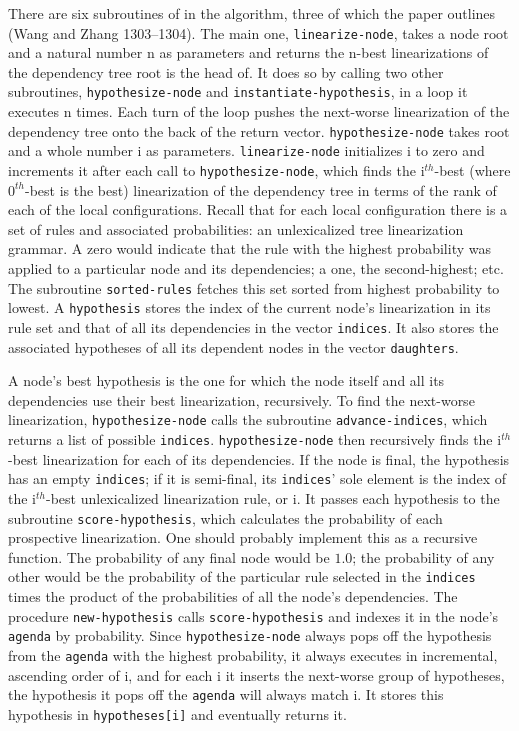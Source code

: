 \documentclass[12pt,letterpaper]{article}
\begin{document}
\begin{flushleft}
  There are six subroutines of in the algorithm, three of which the paper outlines (Wang and Zhang 1303--1304). The main one, \texttt{linearize-node}, takes a node $\textrm{root}$ and a natural number $\textrm{n}$ as parameters and returns the $\textrm{n}$-best linearizations of the dependency tree $\textrm{root}$ is the head of. It does so by calling two other subroutines, \texttt{hypothesize-node} and \texttt{instantiate-hypothesis}, in a loop it executes $\textrm{n}$ times. Each turn of the loop pushes the next-worse linearization of the dependency tree onto the back of the return vector. \texttt{hypothesize-node} takes $\textrm{root}$ and a whole number $\textrm{i}$ as parameters. \texttt{linearize-node} initializes $\textrm{i}$ to zero and increments it after each call to \texttt{hypothesize-node}, which finds the $\textrm{i}^{th}$-best (where $0^{th}$-best is the best) linearization of the dependency tree in terms of the rank of each of the local configurations. Recall that for each local configuration there is a set of rules and associated probabilities: an unlexicalized tree linearization grammar. A zero would indicate that the rule with the highest probability was applied to a particular node and its dependencies; a one, the second-highest; etc. The subroutine \texttt{sorted-rules} fetches this set sorted from highest probability to lowest. A \texttt{hypothesis} stores the index of the current node's linearization in its rule set and that of all its dependencies in the vector \texttt{indices}. It also stores the associated hypotheses of all its dependent nodes in the vector \texttt{daughters}.

  A node's best hypothesis is the one for which the node itself and all its dependencies use their best linearization, recursively. To find the next-worse linearization, \texttt{hypothesize-node} calls the subroutine \texttt{advance-indices}, which returns a list of possible \texttt{indices}. \texttt{hypothesize-node} then recursively finds the $\textrm{i}^{th}$-best linearization for each of its dependencies. If the node is final, the hypothesis has an empty \texttt{indices}; if it is semi-final, its \texttt{indices}' sole element is the index of the $\textrm{i}^{th}$-best unlexicalized linearization rule, or $\textrm{i}$. It passes each hypothesis to the subroutine \texttt{score-hypothesis}, which calculates the probability of each prospective linearization. One should probably implement this as a recursive function. The probability of any final node would be $1.0$; the probability of any other would be the probability of the particular rule selected in the \texttt{indices} times the product of the probabilities of all the node's dependencies. The procedure \texttt{new-hypothesis} calls \texttt{score-hypothesis} and indexes it in the node's \texttt{agenda} by probability. Since \texttt{hypothesize-node} always pops off the hypothesis from the \texttt{agenda} with the highest probability, it always executes in incremental, ascending order of $\textrm{i}$, and for each $\textrm{i}$ it inserts the next-worse group of hypotheses, the hypothesis it pops off the \texttt{agenda} will always match $\textrm{i}$. It stores this hypothesis in \texttt{hypotheses[i]} and eventually returns it.

\end{flushleft}
\end{document}
